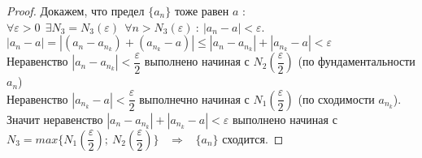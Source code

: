 \documentclass[12pt]{article}
\begin{document}
\begin{proof}
    Докажем, что предел $\{a_n\}$ тоже равен $a$ : 
    $\forall \varepsilon > 0 \ \ \exists N_3 = N_3(\varepsilon) \ \ \forall n > N_3(\varepsilon) \ : \ |a_n - a| < \varepsilon$. \\
    $|a_n - a| = |(a_n - a_{n_k}) + (a_{n_k} - a)| \leq |a_n - a_{n_k}| + |a_{n_k} - a| < \varepsilon$ \\
    Неравенство $|a_n - a_{n_k}| < \dfrac{\varepsilon}{2}$ выполнено начиная с $N_2\left(\dfrac{\varepsilon}{2}\right)$ (по фундаментальности $a_n$) \\
    Неравенство $|a_{n_k} - a| < \dfrac{\varepsilon}{2}$ выполнечно начиная с $N_1\left(\dfrac{\varepsilon}{2}\right)$ (по сходимости $a_{n_k}$). \\
    Значит неравенство $|a_n - a_{n_k}| + |a_{n_k} - a| < \varepsilon$ выполнено начиная с $N_3 = max\{N_1\left(\dfrac{\varepsilon}{2}\right); \ N_2\left(\dfrac{\varepsilon}{2}\right)\}$ \ $\Rightarrow$ \ $\{a_n\}$ сходится.
\end{proof}
\end{document}

